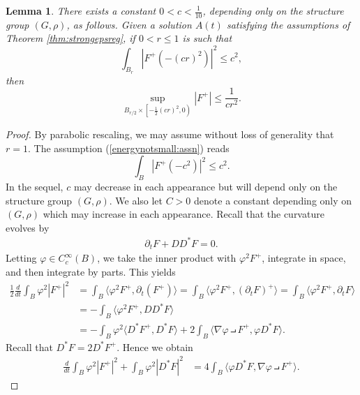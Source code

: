 \documentclass[12pt]{amsart}
\newcommand{\LB}{\left[}
\renewcommand{\1}{{\mathbf 1}}
\newtheorem{lemma}[thm]{Lemma}
\theoremstyle{others}
\numberwithin{equation}{section}
\begin{document}
\begin{lemma}\label{lemma:energynotsmall}
    There exists a constant $0 < c < \frac{1}{10}$, depending only on the structure group \((G, \rho)\), as follows. Given a solution $A(t)$ satisfying the assumptions of Theorem \ref{thm:strongepsreg}, if $0 < r \leq 1$ is such that
    \begin{equation}\label{energynotsmall:assn}
       \int_{B_{r}} \left|F^+\left( -(cr)^2 \right) \right|^2 \leq c^2,
    \end{equation}
    then
    \begin{equation}\label{energynotsmall:est}
        \sup_{ B_{r/2} \times \LB - \frac12 (cr)^2, 0 \right) } |F^+| \leq \frac{1}{cr^2}.
    \end{equation}
\end{lemma}
\begin{proof} 
By parabolic rescaling, we may assume without loss of generality that $r = 1.$ %
The assumption (\ref{energynotsmall:assn}) reads
\begin{equation}
    \int_{B} |F^+(-c^2)|^2 \leq c^2.
\end{equation} In the sequel, \(c\) may decrease in each appearance but will depend only on the structure group \((G, \rho)\). We also let $C > 0$ denote a constant depending only on $(G, \rho)$ which may increase in each appearance.
Recall that the curvature evolves by
\begin{align*}
    \partial_t F + D D^\ast F = 0.
\end{align*} Letting \(\varphi \in C_c^\infty(B)\), we take the inner product with \(\varphi^2 F^+\), integrate in space, and then integrate by parts. This yields
\begin{align*}
    \frac{1}{2}\frac{d}{dt} \int_B \varphi^2 |F^+|^2 &= \int_B \langle \varphi^2 F^+, \partial_t (F^+)\rangle = \int_B \langle \varphi^2 F^+, (\partial_t F)^+\rangle = \int_B \langle \varphi^2 F^+, \partial_t F\rangle \\
    &= -\int_B \langle \varphi^2 F^+, D D^\ast F\rangle \\
    &= -\int_B \varphi^2\langle D^\ast F^+, D^\ast F\rangle + 2\int_B \langle \nabla \varphi \intprod F^+,  \varphi D^\ast F\rangle.
\end{align*} Recall that \(D^\ast F = 2D^\ast F^+\). Hence we obtain
\begin{align*}
    \frac{d}{dt}\int_B \varphi^2 |F^+|^2 + \int_B \varphi^2 |D^\ast F|^2 &= 4\int_B  \langle  \varphi D^\ast F, \nabla \varphi \intprod F^+\rangle.

\end{align*}
\end{proof}
\end{document}
